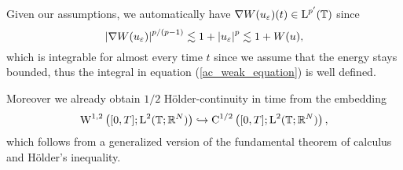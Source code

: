 \begin{remark}
	Given our assumptions, we automatically have $ \nabla W ( u_{ \varepsilon } ) ( t ) \in \operatorname{L}^{ p' } ( \operatorname{\mathbb{T}} ) $ since
	\begin{equation}
		\abs{ \nabla W ( u_{ \varepsilon} ) }^{ p/(p-1) }
		\lesssim
		1+ \abs{u_{ \varepsilon }}^{ p }
		\lesssim
		1 + W ( u ),
	\end{equation}
	which is integrable for almost every time $ t $ since we assume that the energy stays bounded,
	thus the integral in equation (\ref{ac_weak_equation}) is well defined.
	
	Moreover we already obtain $ 1/2 $ Hölder-continuity in time from the embedding
	\begin{equation}
		\label{w12_embeds_into_c1half}
		\operatorname{W}^{ 1 , 2} \left( [ 0 , T ] ; \operatorname{L}^{ 2 } ( \operatorname{\mathbb{T}};\mathbb{ R }^{ 
		N } ) \right)
		\hookrightarrow
		\operatorname{C}^{ 1/2 } \left( [ 0 , T ] ; \operatorname{L}^{ 2 } ( \operatorname{\mathbb{T}} ; \mathbb{ R 
		}^{ N } ) \right),
	\end{equation}
	which follows from a generalized version of the fundamental theorem of calculus and Hölder's inequality.
\end{remark}